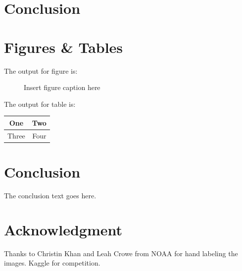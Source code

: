 \documentclass{IET}%
\begin{document}
\section{Conclusion}

\section{Figures \& Tables}

The output for figure is:

\begin{figure}[!h]
\caption{Insert figure caption here
}
\label{fig_sim}
\end{figure}


\vskip2pc

\noindent The output for table is:

\begin{table}[!h]
{%
\begin{tabular}{|c||c|}%
\hline
One & Two\\ %
\hline
Three & Four\\%
\hline
\end{tabular}}{}
\end{table}%

\section{Conclusion}
The conclusion text goes here.

\section{Acknowledgment}

Thanks to Christin Khan and Leah Crowe from NOAA for hand labeling the images. 
Kaggle for competition.
\end{document}
